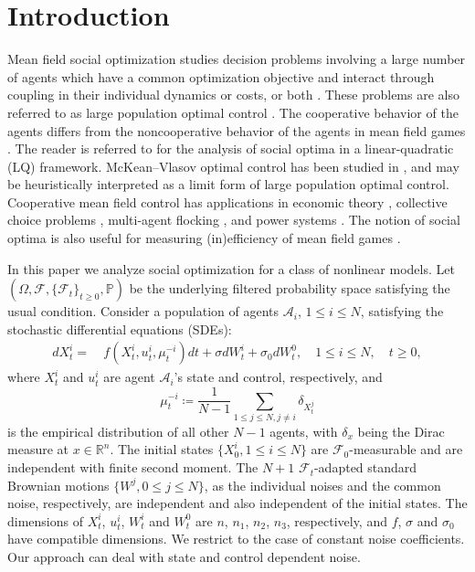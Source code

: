 \documentclass{amsart}
\theoremstyle{definition}
\theoremstyle{remark}
\def\cal{\mathcal}
\numberwithin{equation}{section}
\begin{document}
\tableofcontents

\section{Introduction}




Mean field social optimization studies decision problems involving a large number of agents which have a  common optimization objective and interact through coupling in their individual dynamics or costs, or both \cite{HCM12}. These problems are also referred to as large population optimal control \cite{DPT20}.  The cooperative behavior of the agents differs from the noncooperative behavior of the agents in mean field games \cite{CHM17}. The reader is referred to \cite{AM15,HWY21,HCM12,HY21,WZ17} for the analysis of social optima in a linear-quadratic (LQ) framework.
McKean--Vlasov optimal control has been studied in \cite{BCP18,CDJS22,CD15,DPT22,L17,PW17,TTZ21,WZ20},
 and may be heuristically interpreted as a limit form of large population optimal control. Cooperative mean field control has applications in
economic theory \cite{NM18}, collective choice problems \cite{SNM18}, multi-agent flocking \cite{PRT15},
and power systems \cite{CBM17}. The notion of social optima is also useful
for measuring (in)efficiency of mean  field games \cite{BT13,CR19}.


In this paper we analyze social optimization for a class of nonlinear models.
 Let $(\Omega, {\mathcal F}, \{{\mathcal F}_t\}_{t\ge 0}, {\mathbb P} )$ be the underlying filtered probability space satisfying the usual condition.
Consider a population of  agents ${\cal A}_i$, $1\le i\le N$, satisfying the stochastic differential equations (SDEs):
\begin{align}
dX_t^i=\ & f(X_t^i, u_t^i, \mu_{t}^{-i})dt+
\sigma dW_t^i
+\sigma_0 dW_t^0, \quad  1\le i\le N, \quad  t\ge 0, \label{sdeXi}
\end{align}
where $X_t^i$ and $u_t^i$ are agent ${\mathcal A}_i$'s   state and control, respectively, and
$$\mu_{t}^{-i}\coloneqq \frac{1}{N-1}\sum_{1\le j\le N, j\ne i}\delta_{ X^j_t}$$ is  the empirical distribution of all other $N-1$ agents, with $\delta_x$ being the Dirac measure at $x\in \mathbb{R}^n$. The initial states $\{X_0^i, 1\le i\le N\}$ are ${\mathcal F}_0$-measurable and are independent with finite second moment. The $N+1$ ${\mathcal F}_t$-adapted  standard Brownian motions $\{W^j, 0\le j\le N\}$, as the individual noises and the common noise, respectively, are independent  and   also independent of the initial states.
The dimensions of  $X_t^i$,  $u_t^i$,
$W^i_t$ and $ W^0_t$ are $n$, $n_1$, $n_2$, $n_3$, respectively, and $f$, $\sigma$ and $\sigma_0$ have compatible dimensions.
We restrict to the case of constant noise coefficients. Our approach can deal with  state and control dependent noise.
\end{document}
